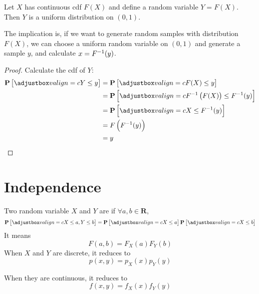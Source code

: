 \begin{theorem}
    Let $X$ has continuous cdf $F(X)$ and define a random variable $Y = F(X)$. Then $Y$ is a uniform distribution on $(0,1)$.
    
    The implication is, if we want to generate random samples with distribution $F(X)$, we can choose a uniform random variable on $(0,1)$ and generate a sample $y$, and calculate $x = {F}^{-1}(y)$.
\end{theorem}
\begin{proof}
    Calculate the cdf of $Y$:
    \begin{equation}
        \begin{aligned}
            \probability{Y \leq y} &= \probability{F(X) \leq y} \\
            &= \probability{ \inverse{F} \left(F(X)\right) \leq \inverse{F} (y) }\\
            &= \probability{X \leq \inverse{F} (y) } \\
            &= F\left(\inverse{F} (y) \right) \\
            &= y
        \end{aligned}
    \end{equation}
\end{proof}




\section{Independence}

\begin{definition}
    Two random variable $X$ and $Y$ are  if $\forall a,b \in \mathbf{R}$,
    \begin{equation}
        \probability{ X \leq a , Y \leq b } = \probability{ X \leq a } \probability{ X \leq b }
    \end{equation}
    It means
    \begin{equation}
        F(a,b) = F_X(a) F_Y(b)
    \end{equation}
    When $X$ and $Y$ are discrete, it reduces to
    \begin{equation}
        p(x,y) = p_X(x) p_Y(y)
    \end{equation}
    
    When they are continuous, it reduces to
    \begin{equation}
        f(x,y)=f_X(x) f_Y(y)
    \end{equation}
\end{definition}

